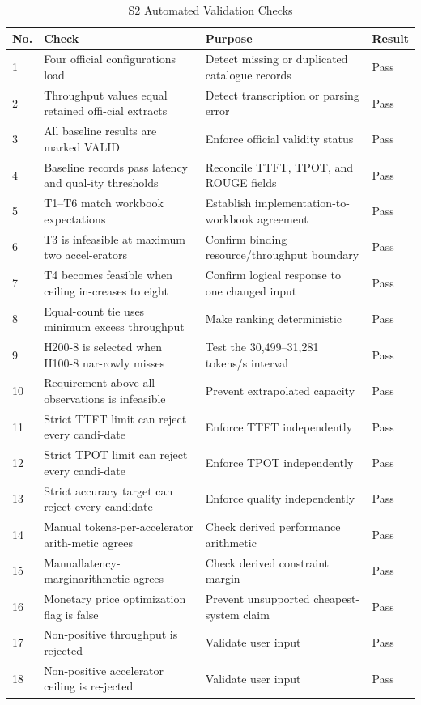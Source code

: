 \documentclass[final,3p,12pt,nopreprintline]{elsarticle}
\begin{document}
\begin{table}[htbp]
\caption{S2 Automated Validation Checks}
\centering
\footnotesize
\setlength{\tabcolsep}{3pt}
\renewcommand{\arraystretch}{1.12}
\begin{tabularx}{\textwidth}{p{0.65cm}X X p{1.2cm}}
\toprule
\textbf{No.} & \textbf{Check} & \textbf{Purpose} & \textbf{Result}\\
\midrule
1 & Four official configurations load & Detect missing or duplicated catalogue records & Pass\\
2 & Throughput values equal retained offi-cial extracts & Detect transcription or parsing error & Pass\\
3 & All baseline results are marked VALID & Enforce official validity status & Pass\\
4 & Baseline records pass latency and qual-ity thresholds & Reconcile TTFT, TPOT, and ROUGE fields & Pass\\
5 & T1–T6 match workbook expectations & Establish implementation-to-workbook agreement & Pass\\
6 & T3 is infeasible at maximum two accel-erators & Confirm binding resource/throughput boundary & Pass\\
7 & T4 becomes feasible when ceiling in-creases to eight & Confirm logical response to one changed input & Pass\\
8 & Equal-count tie uses minimum excess throughput & Make ranking deterministic & Pass\\
9 & H200-8 is selected when H100-8 nar-rowly misses & Test the 30,499–31,281 tokens/s interval & Pass\\
10 & Requirement above all observations is infeasible & Prevent extrapolated capacity & Pass\\
11 & Strict TTFT limit can reject every candi-date & Enforce TTFT independently & Pass\\
12 & Strict TPOT limit can reject every candi-date & Enforce TPOT independently & Pass\\
13 & Strict accuracy target can reject every candidate & Enforce quality independently & Pass\\
14 & Manual  tokens-per-accelerator  arith-metic agrees & Check derived performance arithmetic & Pass\\
15 & Manuallatency-marginarithmetic agrees & Check derived constraint margin & Pass\\
16 & Monetary price optimization flag is false & Prevent unsupported cheapest-system claim & Pass\\
17 & Non-positive throughput is rejected & Validate user input & Pass\\
18 & Non-positive accelerator ceiling is re-jected & Validate user input & Pass\\
\bottomrule
\end{tabularx}
\end{table}
\end{document}
